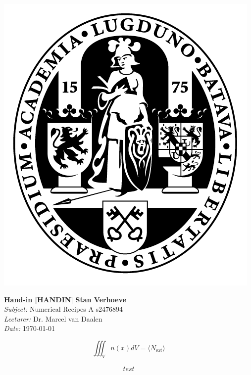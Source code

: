 \documentclass[hidelinks,a4paper,11pt]{article}
\begin{document}
\parbox{0.11\textwidth}{\includegraphics[width=\linewidth]{UL.png}}
\hspace{0.5cm}
\parbox{0.89\textwidth - 0.5cm}{
	\Large\textbf{Hand-in [HANDIN]} \hspace*{\fill} \normalsize\textbf{Stan Verhoeve}\\
	\textit{Subject:} Numerical Recipes A \hspace*{\fill}s2476894\\
	\textit{Lecturer:} Dr. Marcel van Daalen\\
	\textit{Date:} \today
}

\begin{equation}
	\iiint_V n(x)dV = \langle N_\text{sat}\rangle
\end{equation}

\begin{align}
	test
\end{align}
\end{document}
